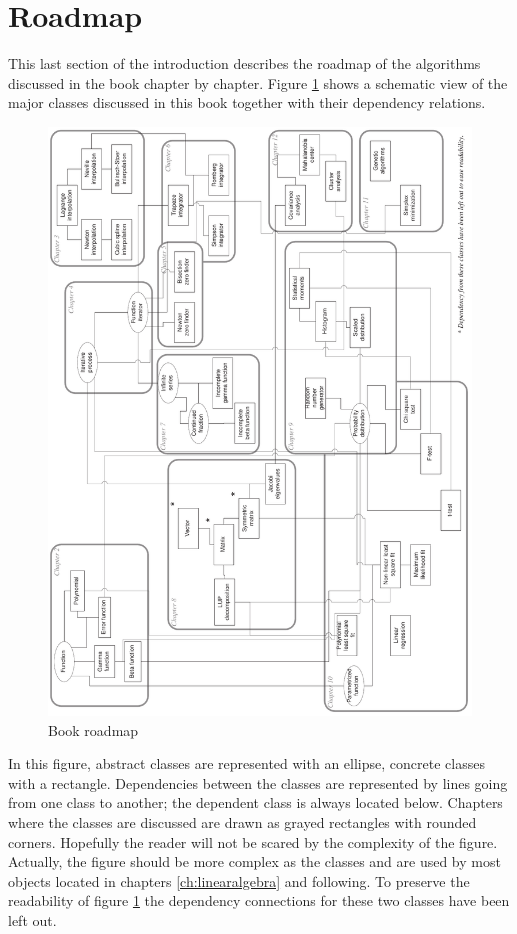 \section{Roadmap}
This last section of the introduction describes the roadmap of
the algorithms discussed in the book chapter by chapter. Figure
\ref{fig:roadmap} shows a schematic view of the major classes
discussed in this book together with their dependency relations.
\begin{figure}
\centering\includegraphics[width=13cm]{Figures/Roadmap}
\caption{Book roadmap} \label{fig:roadmap}
\end{figure}
In this figure, abstract classes are represented with an ellipse,
concrete classes with a rectangle. Dependencies between the
classes are represented by lines going from one class to another;
the dependent class is always located below. Chapters where the
classes are discussed are drawn as grayed rectangles with rounded
corners. Hopefully the reader will not be scared by the complexity
of the figure. Actually, the figure should be more complex as the
classes  and  are used by most objects
located in chapters \ref{ch:linearalgebra} and following. To
preserve the readability of figure \ref{fig:roadmap} the
dependency connections for these two classes have been left out.

